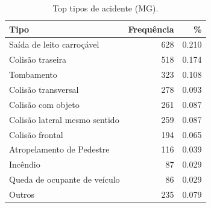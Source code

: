 \begin{table}
\caption{Top tipos de acidente (MG).}
\label{tab:top_tipos}
\begin{tabular}{lrr}
\toprule
Tipo & Frequência & \% \\
\midrule
Saída de leito carroçável & 628 & 0.210 \\
Colisão traseira & 518 & 0.174 \\
Tombamento & 323 & 0.108 \\
Colisão transversal & 278 & 0.093 \\
Colisão com objeto & 261 & 0.087 \\
Colisão lateral mesmo sentido & 259 & 0.087 \\
Colisão frontal & 194 & 0.065 \\
Atropelamento de Pedestre & 116 & 0.039 \\
Incêndio & 87 & 0.029 \\
Queda de ocupante de veículo & 86 & 0.029 \\
Outros & 235 & 0.079 \\
\bottomrule
\end{tabular}
\end{table}

